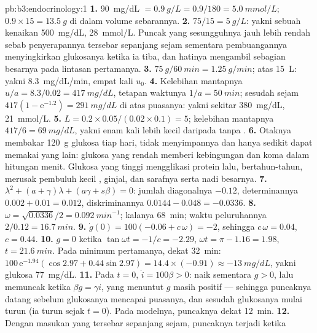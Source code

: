 \begin{solution}{pb:b3:endocrinology:1}
\textbf{1.} \qty{90}{mg/dL} $= \qty{0.9}{g/L} = 0.9/180 = \qty{5.0}{mmol/L}$;
$0.9\times 15 = \qty{13.5}{g}$ di dalam volume sebarannya.
\textbf{2.} $75/15 = \qty{5}{g/L}$: yakni sebuah kenaikan \qty{500}{mg/dL},
\qty{28}{mmol/L}. Puncak yang sesungguhnya jauh lebih rendah sebab penyerapannya
tersebar sepanjang sejam sementara pembuangannya menyingkirkan glukosanya ketika ia tiba, dan
hatinya mengambil sebagian besarnya pada lintasan pertamanya.
\textbf{3.} $\qty{75}{g}/\qty{60}{min} = \qty{1.25}{g/min}$; atas
\qty{15}{L}: yakni \qty{8.3}{mg/dL/min}, empat kali $u_{0}$.
\textbf{4.} Kelebihan mantapnya $u/a = 8.3/0.02 = \qty{417}{mg/dL}$, tetapan
waktunya $1/a = \qty{50}{min}$; sesudah sejam $417(1 -
\mathrm{e}^{-1.2}) = \qty{291}{mg/dL}$ di atas puasanya: yakni sekitar
\qty{380}{mg/dL}, \qty{21}{mmol/L}.
\textbf{5.} $L = 0.2\times 0.05/(0.02\times 0.1) = 5$; kelebihan mantapnya
$417/6 = \qty{69}{mg/dL}$, yakni enam kali lebih kecil daripada tanpa .
\textbf{6.} Otaknya membakar \qty{120}{g} glukosa tiap hari, tidak menyimpannya
dan hanya sedikit dapat memakai yang lain: glukosa yang rendah memberi kebingungan dan koma dalam
hitungan menit. Glukosa yang tinggi mengglikasi protein lalu, bertahun-tahun, merusak
pembuluh kecil , ginjal, dan sarafnya serta nadi besarnya.
\textbf{7.} $\lambda^{2} + (a + \gamma)\lambda + (a\gamma + s\beta) = 0$:
jumlah diagonalnya $-0.12$, determinannya $0.002 + 0.01 = 0.012$, diskriminannya
$0.0144 - 0.048 = -0.0336$.
\textbf{8.} $\omega = \sqrt{0.0336}/2 = \qty{0.092}{min^{-1}}$; kalanya
\qty{68}{min}; waktu peluruhannya $2/0.12 = \qty{16.7}{min}$.
\textbf{9.} $\dot g(0) = 100(-0.06 + c\,\omega) = -2$, sehingga $c\,\omega =
0.04$, $c = 0.44$.
\textbf{10.} $g = 0$ ketika $\tan\omega t = -1/c = -2.29$, $\omega t =
\pi - 1.16 = 1.98$, $t = \qty{21.6}{min}$. Pada minimum pertamanya, dekat
\qty{32}{min}: $100\,\mathrm{e}^{-1.94}(\cos 2.97 + 0.44\sin 2.97) =
14.4\times(-0.91) \approx -\qty{13}{mg/dL}$, yakni glukosa \qty{77}{mg/dL}.
\textbf{11.} Pada $t = 0$, $\dot i = 100\beta > 0$:  naik sementara
$g > 0$, lalu memuncak ketika $\beta g = \gamma i$, yang menuntut $g$ masih
positif --- sehingga puncaknya datang sebelum glukosanya mencapai puasanya, dan sesudah
glukosanya mulai turun (ia turun sejak $t = 0$). Pada modelnya, puncaknya
dekat \qty{12}{min}.
\textbf{12.} Dengan masukan yang tersebar sepanjang sejam, puncaknya terjadi ketika

\end{solution}
